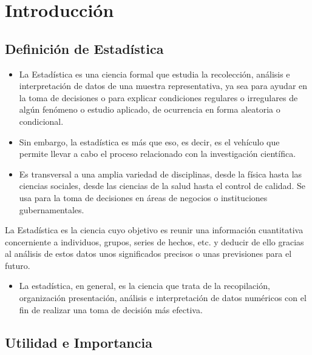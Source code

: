 \section{Introducci\'on}

\subsection{Definici\'on de Estad\'istica}

\begin{itemize}
    \item La Estad\'istica es una ciencia formal que estudia la recolecci\'on, an\'alisis e interpretaci\'on de datos de una muestra representativa, ya sea para ayudar en la toma de decisiones o para explicar condiciones regulares o irregulares de alg\'un fen\'omeno o estudio aplicado, de ocurrencia en forma aleatoria o condicional. 
    \item Sin embargo, la estad\'istica es m\'as que eso, es decir, es el veh\'iculo que permite llevar a cabo el proceso relacionado con la investigaci\'on cient\'ifica. 
    \item Es transversal a una amplia variedad de disciplinas, desde la f\'isica hasta las ciencias sociales, desde las ciencias de la salud hasta el control de calidad. Se usa para la toma de decisiones en \'areas de negocios o instituciones gubernamentales.
\end{itemize}

\begin{Def}
    La Estad\'istica es la ciencia cuyo objetivo es reunir una informaci\'on cuantitativa concerniente a individuos, grupos, series de hechos, etc. y deducir de ello gracias al an\'alisis de estos datos unos significados precisos o unas previsiones para el futuro.
\end{Def}

\begin{itemize}
    \item La estad\'istica, en general, es la ciencia que trata de la recopilaci\'on, organizaci\'on presentaci\'on, an\'alisis e interpretaci\'on de datos num\'ericos con el fin de realizar una toma de decisi\'on m\'as efectiva.
\end{itemize}

\subsection{Utilidad e Importancia}

